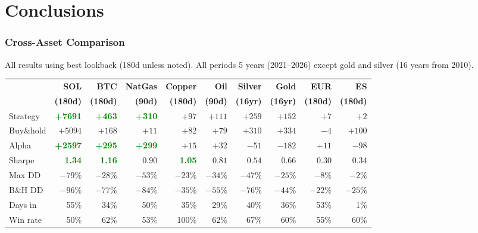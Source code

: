 \documentclass[11pt,a4paper]{article}
\begin{document}
\newpage


\part{Conclusions}

\section{Cross-Asset Comparison}

All results using best lookback (180d unless noted). All periods 5 years
(2021--2026) except gold and silver (16 years from 2010).

\vspace{0.5em}
{\small
\begin{tabular}{@{}lrrrrrrrrr@{}}
    \toprule
    & \textbf{SOL} & \textbf{BTC} & \textbf{NatGas} & \textbf{Copper} & \textbf{Oil} & \textbf{Silver} & \textbf{Gold} & \textbf{EUR} & \textbf{ES} \\
    & \textbf{(180d)} & \textbf{(180d)} & \textbf{(90d)} & \textbf{(180d)} & \textbf{(90d)} & \textbf{(16yr)} & \textbf{(16yr)} & \textbf{(180d)} & \textbf{(180d)} \\
    \midrule
    Strategy    & \textcolor{green}{\textbf{+7691}} & \textcolor{green}{\textbf{+463}} & \textcolor{green}{\textbf{+310}} & $+97$  & $+111$ & $+259$ & $+152$ & $+7$  & $+2$  \\
    Buy\&hold   & $+5094$ & $+168$ & $+11$  & $+82$  & $+79$  & $+310$ & $+334$ & $-4$  & $+100$ \\
    Alpha       & \textcolor{green}{\textbf{+2597}} & \textcolor{green}{\textbf{+295}} & \textcolor{green}{\textbf{+299}} & $+15$  & $+32$  & $-51$  & $-182$ & $+11$ & $-98$ \\
    \midrule
    Sharpe      & \textcolor{green}{\textbf{1.34}} & \textcolor{green}{\textbf{1.16}} & $0.90$ & \textcolor{green}{\textbf{1.05}} & $0.81$ & $0.54$ & $0.66$ & $0.30$ & $0.34$ \\
    Max DD      & $-79\%$ & $-28\%$ & $-53\%$ & $-23\%$ & $-34\%$ & $-47\%$ & $-25\%$ & $-8\%$ & $-2\%$ \\
    B\&H DD     & $-96\%$ & $-77\%$ & $-84\%$ & $-35\%$ & $-55\%$ & $-76\%$ & $-44\%$ & $-22\%$ & $-25\%$ \\
    \midrule
    Days in     & 55\%   & 34\%   & 50\%   & 35\%   & 29\%   & 40\%   & 36\%   & 53\%  & 1\%   \\
    Win rate    & 50\%   & 62\%   & 53\%   & 100\%  & 62\%   & 67\%   & 60\%   & 55\%  & 60\%  \\
    \bottomrule
\end{tabular}
}
\end{document}
